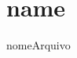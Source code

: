 \documentclass[a4paper, 12pt]{article}
\begin{document}
\tableofcontents
\pagebreak
\section{ name }
 {nomeArquivo}
\end{document}
